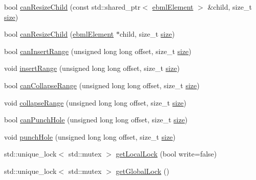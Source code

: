 \begin{DoxyCompactItemize}
\item 
bool \mbox{\hyperlink{classebml_1_1ebmlLazyLoadMasterElement_a37c2ea7d9edb3caee7d07a633d87e2f6}{can\+Resize\+Child}} (const std\+::shared\+\_\+ptr$<$ \mbox{\hyperlink{classebml_1_1ebmlElement}{ebml\+Element}} $>$ \&child, size\+\_\+t \mbox{\hyperlink{namespaceebml_a75eaf24de9c90584c60e27de3b1dd63e}{size}})
\item 
bool \mbox{\hyperlink{classebml_1_1ebmlLazyLoadMasterElement_a7983668a8f9322008b877c425b06d016}{can\+Resize\+Child}} (\mbox{\hyperlink{classebml_1_1ebmlElement}{ebml\+Element}} $\ast$child, size\+\_\+t \mbox{\hyperlink{namespaceebml_a75eaf24de9c90584c60e27de3b1dd63e}{size}})
\item 
bool \mbox{\hyperlink{classebml_1_1ebmlLazyLoadMasterElement_a462f5c232a854a4051966018ae4863e8}{can\+Insert\+Range}} (unsigned long long offset, size\+\_\+t \mbox{\hyperlink{namespaceebml_a75eaf24de9c90584c60e27de3b1dd63e}{size}})
\item 
void \mbox{\hyperlink{classebml_1_1ebmlLazyLoadMasterElement_aae90c5574945b5ec409647bb2c2f0582}{insert\+Range}} (unsigned long long offset, size\+\_\+t \mbox{\hyperlink{namespaceebml_a75eaf24de9c90584c60e27de3b1dd63e}{size}})
\item 
bool \mbox{\hyperlink{classebml_1_1ebmlLazyLoadMasterElement_a5ec9c15f68e5d0235d2b154f8e0c83d0}{can\+Collapse\+Range}} (unsigned long long offset, size\+\_\+t \mbox{\hyperlink{namespaceebml_a75eaf24de9c90584c60e27de3b1dd63e}{size}})
\item 
void \mbox{\hyperlink{classebml_1_1ebmlLazyLoadMasterElement_aa562e001271845243cce7941ef438064}{collapse\+Range}} (unsigned long long offset, size\+\_\+t \mbox{\hyperlink{namespaceebml_a75eaf24de9c90584c60e27de3b1dd63e}{size}})
\item 
bool \mbox{\hyperlink{classebml_1_1ebmlLazyLoadMasterElement_adbc3d8af9eb656d04d2de5ee1686b3eb}{can\+Punch\+Hole}} (unsigned long long offset, size\+\_\+t \mbox{\hyperlink{namespaceebml_a75eaf24de9c90584c60e27de3b1dd63e}{size}})
\item 
void \mbox{\hyperlink{classebml_1_1ebmlLazyLoadMasterElement_a93203911d618598093bb43df129058c4}{punch\+Hole}} (unsigned long long offset, size\+\_\+t \mbox{\hyperlink{namespaceebml_a75eaf24de9c90584c60e27de3b1dd63e}{size}})
\item 
std\+::unique\+\_\+lock$<$ std\+::mutex $>$ \mbox{\hyperlink{classebml_1_1ebmlLazyLoadMasterElement_aaae57b82897e17746f95896aa3d06701}{get\+Local\+Lock}} (bool write=false)
\item 
std\+::unique\+\_\+lock$<$ std\+::mutex $>$ \mbox{\hyperlink{classebml_1_1ebmlLazyLoadMasterElement_a7896238c8131838ff90055a6daf08e19}{get\+Global\+Lock}} ()
\end{DoxyCompactItemize}
